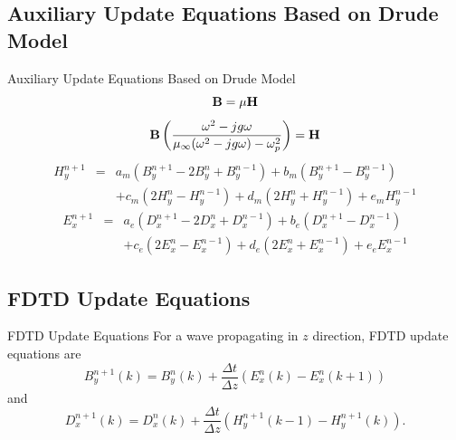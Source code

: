 \documentclass{beamer}
\begin{document}
\subsection{Auxiliary Update Equations Based on Drude Model}
\begin{frame}{Auxiliary Update Equations Based on Drude Model}
\vspace{-0.5cm}
\begin{equation*}
\centering
\textbf{B} = \mu \textbf{H}
\label{B-mu-H}
\end{equation*}
\begin{equation*}
\centering
\nonumber \textbf{B} \left( \dfrac{\omega^2-jg\omega}{\mu_\infty(\omega^2-jg\omega)-\omega^2_p} \right) =\textbf{H}
\label{B-muomega-H}
\end{equation*}
\begin{eqnarray*}
\nonumber H^{n+1}_y &=& a_m\left(B^{n+1}_y-2B^n_y+B^{n-1}_y\right)+b_m\left(B^{n+1}_y-B^{n-1}_y\right)\\
&&+c_m\left(2H^n_y-H^{n-1}_y\right)+d_m\left(2H^n_y+H^{n-1}_y\right)+e_m H^{n-1}_y
\label{2nd-order-B-H-final-form}
\end{eqnarray*}
\begin{eqnarray*}
\nonumber E^{n+1}_x &=& a_e\left(D^{n+1}_x-2D^n_x+D^{n-1}_x\right)+b_e\left(D^{n+1}_x-D^{n-1}_x\right)\\
&&+c_e\left(2E^n_x-E^{n-1}_x\right)+d_e\left(2E^n_x+E^{n-1}_x\right)+e_e E^{n-1}_x
\label{2nd-order-D-E-final-form}
\end{eqnarray*}
\end{frame}
\subsection{FDTD Update Equations}
\begin{frame}{FDTD Update Equations}
For a wave propagating in $z$ direction, FDTD update equations are
\begin{equation}
B^{n+1}_y(k)=B^n_y(k)+\dfrac{\Delta t}{\Delta z}\left(E^n_x(k)-E^n_x(k+1)\right)
\label{1D-B-Update-Equation}
\end{equation}
and
\begin{equation}
D^{n+1}_x(k)=D^n_x(k)+\dfrac{\Delta t}{\Delta z}\left(H^{n+1}_y(k-1)-H^{n+1}_y(k)\right).
\label{1D-D-Update-Equation}
\end{equation}
\end{frame}
\end{document}
